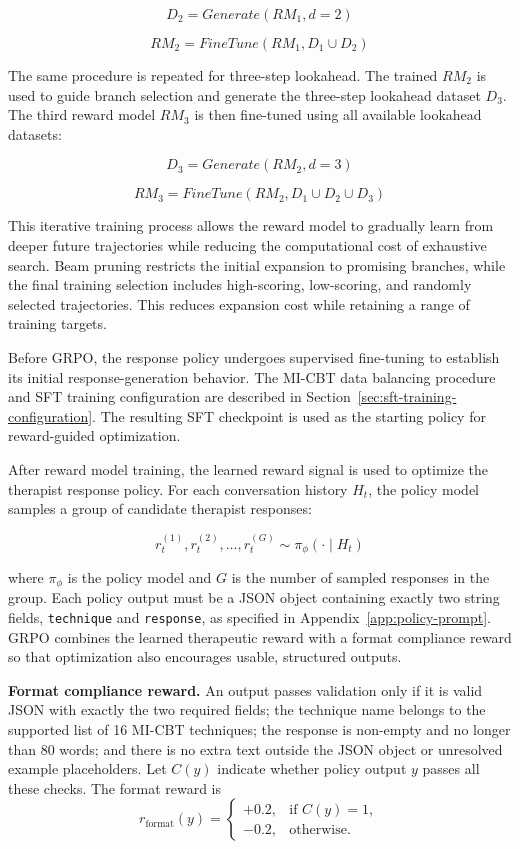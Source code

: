 \[
D_2 = Generate(RM_1, d=2)
\]

\[
RM_2 = FineTune(RM_1, D_1 \cup D_2)
\]

The same procedure is repeated for three-step lookahead. The trained \(RM_2\) is used to guide branch selection and generate the three-step lookahead dataset \(D_3\). The third reward model \(RM_3\) is then fine-tuned using all available lookahead datasets:

\[
D_3 = Generate(RM_2, d=3)
\]

\[
RM_3 = FineTune(RM_2, D_1 \cup D_2 \cup D_3)
\]

This iterative training process allows the reward model to gradually learn from deeper future trajectories while reducing the computational cost of exhaustive search. Beam pruning restricts the initial expansion to promising branches, while the final training selection includes high-scoring, low-scoring, and randomly selected trajectories. This reduces expansion cost while retaining a range of training targets.

Before GRPO, the response policy undergoes supervised fine-tuning to establish its initial response-generation behavior. The MI-CBT data balancing procedure and SFT training configuration are described in Section~\ref{sec:sft-training-configuration}. The resulting SFT checkpoint is used as the starting policy for reward-guided optimization.

After reward model training, the learned reward signal is used to optimize the therapist response policy. For each conversation history \(H_t\), the policy model samples a group of candidate therapist responses:

\[
r_t^{(1)}, r_t^{(2)}, \ldots, r_t^{(G)} \sim \pi_{\phi}(\cdot \mid H_t)
\]

where \(\pi_{\phi}\) is the policy model and \(G\) is the number of sampled responses in the group. Each policy output must be a JSON object containing exactly two string fields, \texttt{technique} and \texttt{response}, as specified in Appendix~\ref{app:policy-prompt}. GRPO combines the learned therapeutic reward with a format compliance reward so that optimization also encourages usable, structured outputs.

\textbf{Format compliance reward.}
An output passes validation only if it is valid JSON with exactly the two required fields; the technique name belongs to the supported list of 16 MI-CBT techniques; the response is non-empty and no longer than 80 words; and there is no extra text outside the JSON object or unresolved example placeholders. Let \(C(y)\) indicate whether policy output \(y\) passes all these checks. The format reward is
\begin{equation}
r_{\mathrm{format}}(y)=
\begin{cases}
+0.2, & \text{if } C(y)=1,\\
-0.2, & \text{otherwise}.
\end{cases}
\label{eq:format-compliance-reward}
\end{equation}


